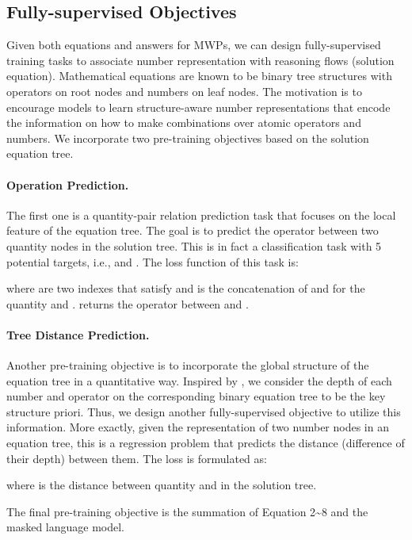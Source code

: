 \documentclass[11pt]{article}
\begin{document}
\subsection{Fully-supervised Objectives}
Given both equations and answers for MWPs, we can design fully-supervised training tasks to associate number representation with reasoning flows (solution equation). Mathematical equations are known to be binary tree structures with operators on root nodes and numbers on leaf nodes. The motivation is to encourage models to learn structure-aware number representations that encode the information on how to make combinations over atomic operators and numbers. We incorporate two pre-training objectives based on the solution equation tree. 

\paragraph{Operation Prediction.} The first one is a quantity-pair relation prediction task that focuses on the local feature of the equation tree. The goal is to predict the operator between two quantity nodes in the solution tree. This is in fact a classification task with 5 potential targets, i.e.,  and . The loss function of this task is:

where  are two indexes that satisfy  and  is the concatenation of  and  for the quantity  and .  returns the operator between  and .

\paragraph{Tree Distance Prediction.} Another pre-training objective is to incorporate the global structure of the equation tree in a quantitative way. Inspired by \citet{DBLP:conf/naacl/HewittM19}, we consider the depth of each number and operator on the corresponding binary equation tree to be the key structure priori. Thus, we design another fully-supervised objective to utilize this information. More exactly, given the representation of two number nodes in an equation tree, this is a regression problem that predicts the distance (difference of their depth) between them. The loss is formulated as:

where  is the distance between quantity  and  in the solution tree.

The final pre-training objective is the summation of Equation 2\textasciitilde8 and the masked language model.
\end{document}
